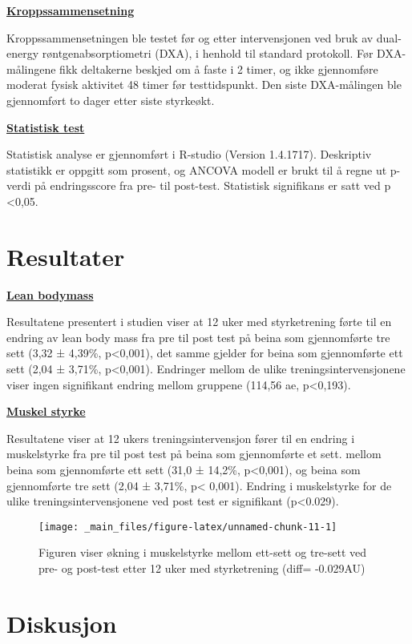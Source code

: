 \documentclass[
]{book}
\begin{document}
\underline{\textbf{Kroppssammensetning}}

Kroppssammensetningen ble testet før og etter intervensjonen ved bruk av
dual-energy røntgenabsorptiometri (DXA), i henhold til standard
protokoll. Før DXA-målingene fikk deltakerne beskjed om å faste i 2
timer, og ikke gjennomføre moderat fysisk aktivitet 48 timer før
testtidspunkt. Den siste DXA-målingen ble gjennomført to dager etter
siste styrkeøkt.

\underline{\textbf{Statistisk test}}

Statistisk analyse er gjennomført i R-studio (Version 1.4.1717).
Deskriptiv statistikk er oppgitt som prosent, og ANCOVA modell er brukt
til å regne ut p-verdi på endringsscore fra pre- til post-test.
Statistisk signifikans er satt ved p \textless0,05.

\hypertarget{resultater-2}{%
\section{Resultater}\label{resultater-2}}

\underline{\textbf{Lean bodymass}}

Resultatene presentert i studien viser at 12 uker med styrketrening
førte til en endring av lean body mass fra pre til post test på beina
som gjennomførte tre sett (3,32 ± 4,39\%, p\textless0,001), det samme
gjelder for beina som gjennomførte ett sett (2,04 ± 3,71\%,
p\textless0,001). Endringer mellom de ulike treningsintervensjonene
viser ingen signifikant endring mellom gruppene (114,56 ae,
p\textless0,193).

\underline{\textbf{Muskel styrke}}

Resultatene viser at 12 ukers treningsintervensjon fører til en endring
i muskelstyrke fra pre til post test på beina som gjennomførte et sett.
mellom beina som gjennomførte ett sett (31,0 ± 14,2\%, p\textless0,001),
og beina som gjennomførte tre sett (2,04 ± 3,71\%, p\textless{} 0,001).
Endring i muskelstyrke for de ulike treningsintervensjonene ved post
test er signifikant (p\textless0.029).

\begin{figure}
\texttt{[image: \_main\_files/figure-latex/unnamed-chunk-11-1]} \caption{Figuren viser økning i muskelstyrke mellom ett-sett og tre-sett ved pre- og post-test etter 12 uker med styrketrening (diff= -0.029AU)}\label{fig:unnamed-chunk-11}
\end{figure}

\hypertarget{diskusjon-2}{%
\section{Diskusjon}\label{diskusjon-2}}
\end{document}
